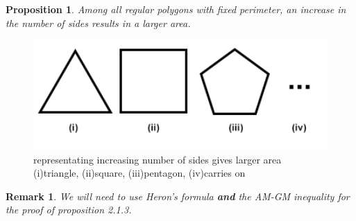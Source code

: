 \documentclass[a4paper]{book}
\newtheorem{remark}[theorem]{Remark}%
\newtheorem{proposition}[theorem]{Proposition}%
\numberwithin{theorem}{section}%
\begin{document}
\begin{proposition}
    Among all regular polygons with fixed perimeter, an increase in the number of sides results in a larger area.  
\end{proposition}
\begin{figure}[hbt!]
    \begin{center}   
        \includegraphics[width=140mm]{isofig11}
        \caption{representating increasing number of sides gives larger area (i)triangle, (ii)square, (iii)pentagon, (iv)carries on}
    \end{center}
\end{figure}\leavevmode
\begin{remark}
    We will need to use Heron's formula \textbf{and} the AM-GM inequality for the proof of proposition 2.1.3.
\end{remark}
\end{document}
